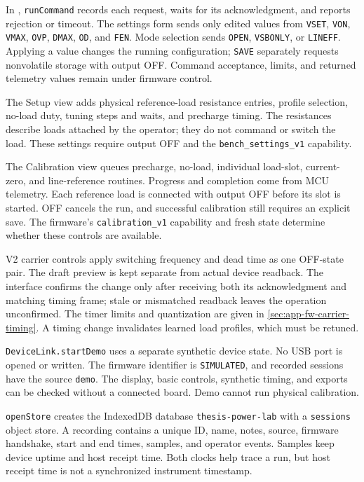 In , \texttt{runCommand} records each request, waits
for its acknowledgment, and reports rejection or timeout. The settings
form sends only edited values from \texttt{VSET}, \texttt{VON}, \texttt{VMAX},
\texttt{OVP}, \texttt{DMAX}, \texttt{OD}, and \texttt{FEN}. Mode
selection sends \texttt{OPEN}, \texttt{VSBONLY}, or \texttt{LINEFF}.
Applying a value changes the running configuration; \texttt{SAVE}
separately requests nonvolatile storage with output OFF. Command acceptance,
limits, and returned telemetry values remain under firmware control.

The Setup view adds physical reference-load resistance entries, profile selection, no-load duty, tuning steps and waits, and precharge timing. The resistances describe loads attached by the operator; they do not command or switch the load. These settings require output OFF and the \texttt{bench\_settings\_v1} capability.

The Calibration view queues precharge, no-load, individual load-slot, current-zero, and line-reference routines. Progress and completion come from MCU telemetry. Each reference load is connected with output OFF before its slot is started. OFF cancels the run, and successful calibration still requires an explicit save. The firmware's \texttt{calibration\_v1} capability and fresh state determine whether these controls are available.

V2 carrier controls apply switching frequency and dead time as one OFF-state pair. The draft preview is kept separate from actual device readback. The interface confirms the change only after receiving both its acknowledgment and matching timing frame; stale or mismatched readback leaves the operation unconfirmed. The timer limits and quantization are given in \cref{sec:app-fw-carrier-timing}. A timing change invalidates learned load profiles, which must be retuned.

\texttt{DeviceLink.startDemo} uses a separate synthetic device
state. No USB port is opened or written. The firmware identifier is
\texttt{SIMULATED}, and recorded sessions have the source \texttt{demo}.
The display, basic controls, synthetic timing, and exports can be checked without a connected board. Demo cannot run physical calibration.

\texttt{openStore} creates the IndexedDB database \texttt{thesis-power-lab}
with a \texttt{sessions} object store. A recording contains a
unique ID, name, notes, source, firmware handshake, start and
end times, samples, and operator events. Samples keep device
uptime and host receipt time. Both clocks help trace a run, but
host receipt time is not a synchronized instrument timestamp.

